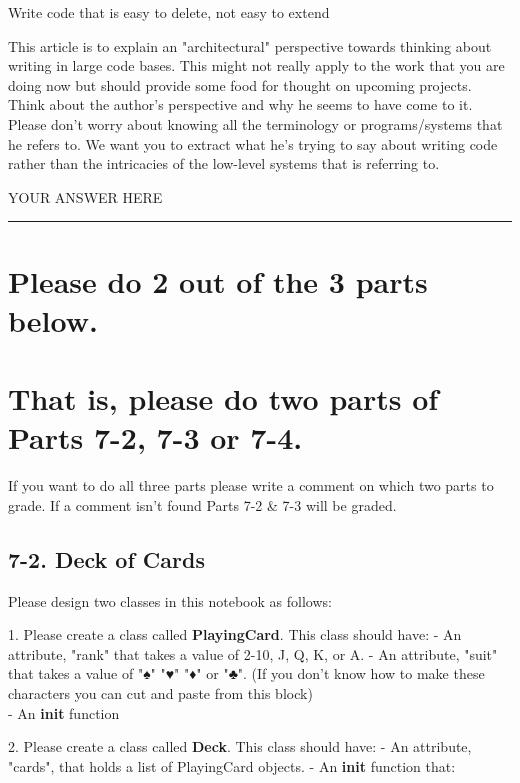 \documentclass[11pt]{article}
\begin{document}
Write code that is easy to delete, not easy to extend

This article is to explain an "architectural" perspective towards
thinking about writing in large code bases. This might not really apply
to the work that you are doing now but should provide some food for
thought on upcoming projects. Think about the author's perspective and
why he seems to have come to it. Please don't worry about knowing all
the terminology or programs/systems that he refers to. We want you to
extract what he's trying to say about writing code rather than the
intricacies of the low-level systems that is referring to.

    YOUR ANSWER HERE

    \begin{center}\rule{0.5\linewidth}{\linethickness}\end{center}

\section{Please do 2 out of the 3 parts
below.}\label{please-do-2-out-of-the-3-parts-below.}

\section{That is, please do two parts of Parts 7-2, 7-3 or
7-4.}\label{that-is-please-do-two-parts-of-parts-7-2-7-3-or-7-4.}

If you want to do all three parts please write a comment on which two
parts to grade. If a comment isn't found Parts 7-2 \& 7-3 will be
graded.

    \subsection{7-2. Deck of Cards}\label{deck-of-cards}

Please design two classes in this notebook as follows:

1. Please create a class called \textbf{PlayingCard}. This class should
have: - An attribute, "rank" that takes a value of 2-10, J, Q, K, or A.
- An attribute, "suit" that takes a value of "♠" "♥" "♦" or "♣". (If you
don't know how to make these characters you can cut and paste from this
block)\\
- An \textbf{init} function

2. Please create a class called \textbf{Deck}. This class should have: -
An attribute, "cards", that holds a list of PlayingCard objects. - An
\textbf{init} function that:
\end{document}
